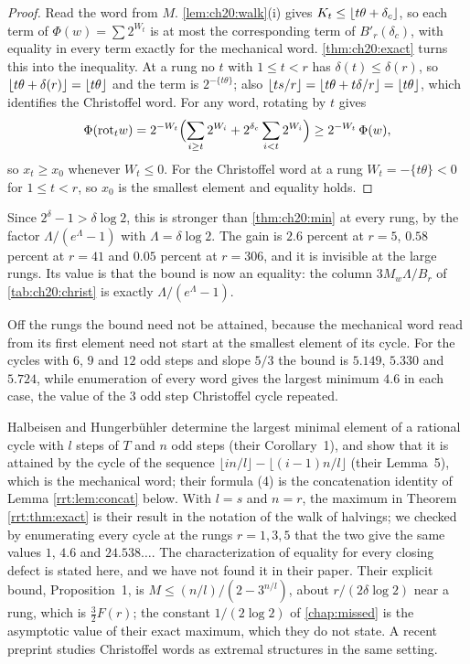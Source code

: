 \begin{proof}
Read the word from $M$. \cref{lem:ch20:walk}(i) gives $K_t\le\lfloor t\theta+\delta_c\rfloor$, so each term of $\Phi(w)=\sum 2^{W_t}$ is at most the corresponding term of $B'_r(\delta_c)$, with equality in every term exactly for the mechanical word. \cref{thm:ch20:exact} turns this into the inequality. At a rung no $t$ with $1\le t<r$ has $\delta(t)\le\delta(r)$, so $\lfloor t\theta+\delta(r)\rfloor=\lfloor t\theta\rfloor$ and the term is $2^{-\{t\theta\}}$; also $\lfloor ts/r\rfloor=\lfloor t\theta+t\delta/r\rfloor=\lfloor t\theta\rfloor$, which identifies the Christoffel word. For any word, rotating by $t$ gives
\[
\Phi(\mathrm{rot}_t w)=2^{-W_t}\Bigl(\sum_{i\ge t}2^{W_i}+2^{\delta_c}\sum_{i<t}2^{W_i}\Bigr)\ge 2^{-W_t}\,\Phi(w),
\]
so $x_t\ge x_0$ whenever $W_t\le 0$. For the Christoffel word at a rung $W_t=-\{t\theta\}<0$ for $1\le t<r$, so $x_0$ is the smallest element and equality holds.
\end{proof}

Since $2^{\delta}-1>\delta\log 2$, this is stronger than \cref{thm:ch20:min} at every rung, by the factor $\Lambda/(e^{\Lambda}-1)$ with $\Lambda=\delta\log 2$. The gain is $2.6$ percent at $r=5$, $0.58$ percent at $r=41$ and $0.05$ percent at $r=306$, and it is invisible at the large rungs. Its value is that the bound is now an equality: the column $3M_w\Lambda/B_r$ of \cref{tab:ch20:christ} is exactly $\Lambda/(e^{\Lambda}-1)$.

Off the rungs the bound need not be attained, because the mechanical word read from its first element need not start at the smallest element of its cycle. For the cycles with $6$, $9$ and $12$ odd steps and slope $5/3$ the bound is $5.149$, $5.330$ and $5.724$, while enumeration of every word gives the largest minimum $4.6$ in each case, the value of the $3$ odd step Christoffel cycle repeated.

\begin{remark}\label{rrt:rem:hh}
Halbeisen and Hungerb\"uhler \cite{halbeisen1997} determine the largest minimal element of a rational cycle with $l$ steps of $T$ and $n$ odd steps (their Corollary~1), and show that it is attained by the cycle of the sequence $\lfloor in/l\rfloor-\lfloor(i-1)n/l\rfloor$ (their Lemma~5), which is the mechanical word; their formula (4) is the concatenation identity of Lemma \ref{rrt:lem:concat} below. With $l=s$ and $n=r$, the maximum in Theorem \ref{rrt:thm:exact} is their result in the notation of the walk of halvings; we checked by enumerating every cycle at the rungs $r=1,3,5$ that the two give the same values $1$, $4.6$ and $24.538\ldots$. The characterization of equality for every closing defect is stated here, and we have not found it in their paper. Their explicit bound, Proposition~1, is $M\le(n/l)/(2-3^{n/l})$, about $r/(2\delta\log2)$ near a rung, which is $\tfrac32F(r)$; the constant $1/(2\log2)$ of \cref{chap:missed} is the asymptotic value of their exact maximum, which they do not state. A recent preprint \cite{christoffel2026} studies Christoffel words as extremal structures in the same setting.
\end{remark}


